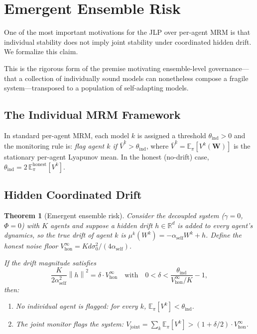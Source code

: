 \documentclass[12pt]{article}
\theoremstyle{plain}
\newtheorem{theorem}{Theorem}[section]
\theoremstyle{definition}
\newcommand{\R}{\mathbb{R}}
\newcommand{\E}{\mathbb{E}}
\newcommand{\W}{\mathbf{W}}
\newcommand{\norm}[1]{\left\lVert #1 \right\rVert}
\begin{document}
\section{Emergent Ensemble Risk}
\label{sec:emergent}

One of the most important motivations for the JLP over per-agent MRM
is that individual stability does not imply joint stability under
coordinated hidden drift.  We formalize this claim.

This is the rigorous form of the premise motivating ensemble-level governance---that a collection of individually sound models can nonetheless compose a fragile system---transposed to a population of self-adapting models.

\subsection{The Individual MRM Framework}

In standard per-agent MRM, each model $k$ is assigned a threshold
$\theta_{\mathrm{ind}} > 0$ and the monitoring rule is:
\emph{flag agent $k$ if $\bar{V}^k > \theta_{\mathrm{ind}}$}, where
$\bar{V}^k = \E_\pi[V^k(\W)]$ is the stationary per-agent Lyapunov
mean.  In the honest (no-drift) case,
$\theta_{\mathrm{ind}} = 2\,\E_\pi^{\mathrm{honest}}[V^k]$.

\subsection{Hidden Coordinated Drift}

\begin{theorem}[Emergent ensemble risk]
  \label{thm:emergent}
  Consider the decoupled system ($\gamma = 0$, $\Phi = 0$) with $K$ agents
  and suppose a hidden drift $h \in \R^d$ is added to every agent's
  dynamics, so the true drift of agent $k$ is
  $\mu^k(W^k) = -\alpha_{\mathrm{self}} W^k + h$.
  Define the honest noise floor
  $V^\infty_{\mathrm{hon}} = Kd\sigma_0^2/(4\alpha_{\mathrm{self}})$.

  If the drift magnitude satisfies
  \begin{equation}
    \frac{K}{2\alpha_{\mathrm{self}}^2}\norm{h}^2
    = \delta \cdot V^\infty_{\mathrm{hon}}
    \quad\text{with}\quad 0 < \delta < \frac{\theta_{\mathrm{ind}}}
    {V^\infty_{\mathrm{hon}} / K} - 1,
    \label{eq:h_condition}
  \end{equation}
  then:
  \begin{enumerate}[label=(\roman*)]
    \item No individual agent is flagged: for every $k$,
      $\E_\pi[V^k] < \theta_{\mathrm{ind}}$.
    \item The joint monitor flags the system:
      $V_{\mathrm{joint}} = \sum_k \E_\pi[V^k] >
      (1 + \delta/2) \cdot V^\infty_{\mathrm{hon}}$.
  \end{enumerate}
\end{theorem}
\end{document}
